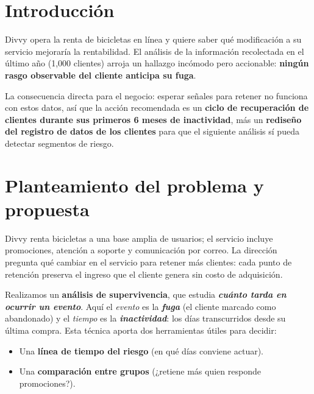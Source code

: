 \documentclass[
  10pt,
  titlepage]{article}
\title{\titulo}
\author{}
\date{\vspace{-2.5em}}
\providecommand{\tightlist}{%
  \setlength{\itemsep}{0pt}\setlength{\parskip}{0pt}}
\begin{document}
\maketitle

\section{Introducción}\label{introducciuxf3n}

Divvy opera la renta de bicicletas en línea y quiere saber qué
modificación a su servicio mejoraría la rentabilidad. El análisis de la
información recolectada en el último año (1,000 clientes)
arroja un hallazgo incómodo pero accionable: \textbf{ningún rasgo observable del
cliente anticipa su fuga}.

La consecuencia directa para el negocio: esperar señales para retener no
funciona con estos datos, así que la acción recomendada es un
\textbf{ciclo de recuperación de clientes durante sus primeros 6 meses de inactividad},
más un \textbf{rediseño del registro de datos de los clientes}
para que el siguiente análisis sí pueda detectar segmentos de riesgo.

\section{Planteamiento del problema y propuesta}\label{planteamiento-del-problema-y-propuesta}

Divvy renta bicicletas a una base amplia de usuarios; el
servicio incluye promociones, atención a soporte y comunicación por correo.
La dirección pregunta qué cambiar en el servicio para retener más clientes:
cada punto de retención preserva el ingreso que el cliente genera sin costo de
adquisición.

Realizamos un \textbf{análisis de supervivencia}, que estudia
\textbf{\emph{cuánto tarda en ocurrir un evento}}. Aquí el \emph{evento} es la \textbf{\emph{fuga}}
(el cliente marcado como abandonado) y el \emph{tiempo} es la \textbf{\emph{inactividad}}:
los días transcurridos desde su última compra.
Esta técnica aporta dos herramientas útiles para decidir:

\begin{itemize}
\tightlist
\item
  Una \textbf{línea de tiempo del riesgo} (en qué días conviene actuar).
\item
  Una \textbf{comparación entre grupos} (¿retiene más quien responde promociones?).
\end{itemize}
\end{document}
